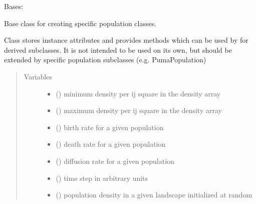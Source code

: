 \documentclass[letterpaper,10pt,english]{sphinxmanual}
\begin{document}
\begin{fulllineitems}
\label{\detokenize{pumha:pumha.pop.Population}}
Bases: 

Base class for creating specific population classes.

Class stores instance attributes and provides methods which can be used by
for derived subclasses. It is not intended to be used on its own, but
should be extended by specific population subclasses (e.g. PumaPopulation)
\begin{quote}\begin{description}
\item[{Variables}] \leavevmode\begin{itemize}
\item {} 
 () \textendash{} minimum density per ij square in the density array

\item {} 
 () \textendash{} maximum density per ij square in the density array

\item {} 
 () \textendash{} birth rate for a given population

\item {} 
 () \textendash{} death rate for a given population

\item {} 
 () \textendash{} diffusion rate for a given population

\item {} 
 () \textendash{} time step in arbitrary units

\item {} 
 () \textendash{} population density in a given landscape initialized at random

\end{itemize}


\end{description}
\end{quote}
\end{fulllineitems}
\end{document}
